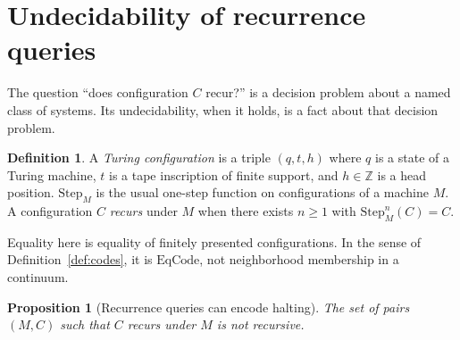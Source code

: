 \documentclass[11pt]{article}
\newcommand{\ZZ}{\mathbb{Z}}
\newtheorem{proposition}[theorem]{Proposition}
\theoremstyle{definition}
\newtheorem{definition}[theorem]{Definition}
\theoremstyle{remark}
\begin{document}
\section{Undecidability of recurrence queries}
\label{sec:undecidable}

The question ``does configuration \(C\) recur?'' is a decision problem about a named class of systems.
Its undecidability, when it holds, is a fact about that decision problem.

\begin{definition}
\label{def:config}
A \emph{Turing configuration} is a triple \((q,t,h)\) where \(q\) is a state of a Turing machine, \(t\) is a tape inscription of finite support, and \(h\in\ZZ\) is a head position.
\(\mathrm{Step}_{M}\) is the usual one-step function on configurations of a machine \(M\).
A configuration \(C\) \emph{recurs} under \(M\) when there exists \(n\geq 1\) with \(\mathrm{Step}_{M}^{n}(C)=C\).
\end{definition}

Equality here is equality of finitely presented configurations.
In the sense of Definition~\ref{def:codes}, it is \(\mathrm{EqCode}\), not neighborhood membership in a continuum.

\begin{proposition}[Recurrence queries can encode halting]
\label{prop:undecidable}
The set of pairs \((M,C)\) such that \(C\) recurs under \(M\) is not recursive.
\end{proposition}
\end{document}
